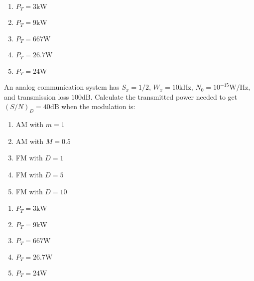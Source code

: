 \documentclass[en,boletin]{uah}
\begin{document}
{
	\begin{enumerate}
		\item $P_T= 3 \textrm{kW}$
  		\item $P_T= 9 \textrm{kW}$
    	\item $P_T= 667 \textrm{W}$
		\item $P_T= 26.7 \textrm{W}$
		\item $P_T= 24 \textrm{W}$
	\end{enumerate}
}{
	\cite{Carlson} An analog communication system has $S_x = 1/2$, $W_x = 10 \textrm{kHz}$, $N_0 = 10^{-15} \textrm{W/Hz}$, and transmission loss $100 \textrm{dB}$. Calculate the transmitted power needed to get $(S/N)_D = 40 \textrm{dB}$ when the modulation is:

	\begin{enumerate}
		\item AM with $m=1$
  		\item AM with $M=0.5$
    	\item FM with $D = 1$
		\item FM with $D = 5$
		\item FM with $D = 10$
	\end{enumerate}
}{
	\begin{enumerate}
		\item $P_T= 3 \textrm{kW}$
  		\item $P_T= 9 \textrm{kW}$
    	\item $P_T= 667 \textrm{W}$
		\item $P_T= 26.7 \textrm{W}$
		\item $P_T= 24 \textrm{W}$
	\end{enumerate}
}
\end{document}
